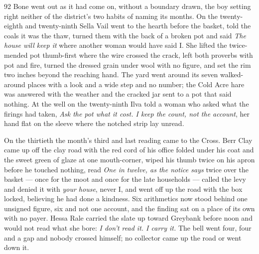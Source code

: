 
\scenebreak


\scenebreak


\scenebreak

\CRtailpiece
\begin{CRchronicle}{92}
Bone went out as it had come on, without a boundary drawn, the boy setting right neither of the district’s two habits of naming its months. On the twenty-eighth and twenty-ninth Sella Vail went to the hearth before the basket, told the coals it was the thaw, turned them with the back of a broken pot and said \emph{The house will keep it} where another woman would have said I. She lifted the twice-mended pot thumb-first where the wire crossed the crack, left both proverbs with pot and fire, turned the dressed grain under wool with no figure, and set the rim two inches beyond the reaching hand. The yard went around its seven walked-around places with a look and a wide step and no number; the Cold Acre hare was answered with the weather and the cracked jar sent to a pot that said nothing. At the well on the twenty-ninth Ilva told a woman who asked what the firings had taken, \emph{Ask the pot what it cost. I keep the count, not the account}, her hand flat on the sleeve where the notched strip lay unread.

On the thirtieth the month’s third and last reading came to the Cross. Berr Clay came up off the clay road with the red cord of his office folded under his coat and the sweet green of glaze at one mouth-corner, wiped his thumb twice on his apron before he touched nothing, read \emph{One in twelve, as the notice says} twice over the basket --- once for the moot and once for the late households --- called the levy and denied it with \emph{your house}, never I, and went off up the road with the box locked, believing he had done a kindness. Six arithmetics now stood behind one unsigned figure, six and not one account, and the finding sat on a place of its own with no payer. Hessa Rale carried the slate up toward Greybank before noon and would not read what she bore: \emph{I don’t read it. I carry it.} The bell went four, four and a gap and nobody crossed himself; no collector came up the road or went down it.


\end{CRchronicle}
